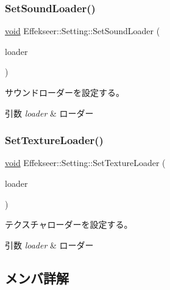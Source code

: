 \subsubsection{\texorpdfstring{Set\+Sound\+Loader()}{SetSoundLoader()}}
{\footnotesize\ttfamily \mbox{\hyperlink{namespace_effekseer_ab34c4088e512200cf4c2716f168deb56}{void}} Effekseer\+::\+Setting\+::\+Set\+Sound\+Loader (\begin{DoxyParamCaption}\item[{\mbox{\hyperlink{class_effekseer_1_1_sound_loader}{Sound\+Loader}} $\ast$}]{loader }\end{DoxyParamCaption})}



サウンドローダーを設定する。 


\begin{DoxyParams}{引数}
{\em loader} & ローダー \\
\hline
\end{DoxyParams}
\mbox{\label{class_effekseer_1_1_setting_a0475d684fcef475fae8250d8b43a5ffc}} 
\subsubsection{\texorpdfstring{Set\+Texture\+Loader()}{SetTextureLoader()}}
{\footnotesize\ttfamily \mbox{\hyperlink{namespace_effekseer_ab34c4088e512200cf4c2716f168deb56}{void}} Effekseer\+::\+Setting\+::\+Set\+Texture\+Loader (\begin{DoxyParamCaption}\item[{\mbox{\hyperlink{class_effekseer_1_1_texture_loader}{Texture\+Loader}} $\ast$}]{loader }\end{DoxyParamCaption})}



テクスチャローダーを設定する。 


\begin{DoxyParams}{引数}
{\em loader} & ローダー \\
\hline
\end{DoxyParams}


\subsection{メンバ詳解}
\mbox{\label{class_effekseer_1_1_setting_af37739356b4116d84dd38d2aba817836}} 
